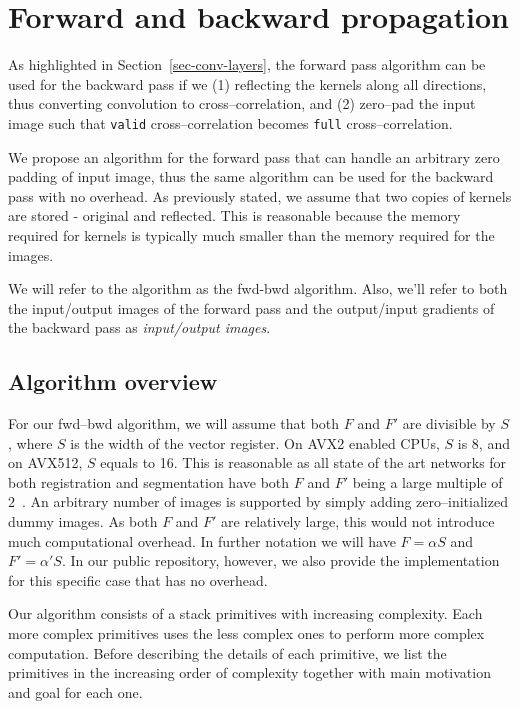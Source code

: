 \section{Forward and backward propagation}

  As highlighted in Section~\ref{sec-conv-layers}, the forward pass
  algorithm can be used for the backward pass if we (1) reflecting the
  kernels along all directions, thus converting convolution to
  cross--correlation, and (2) zero--pad the input image such that
  \texttt{valid} cross--correlation becomes \texttt{full}
  cross--correlation.

  We propose an algorithm for the forward pass that can handle an
  arbitrary zero padding of input image, thus the same algorithm can
  be used for the backward pass with no overhead.  As previously
  stated, we assume that two copies of kernels are stored - original
  and reflected.  This is reasonable because the memory required for
  kernels is typically much smaller than the memory required for the
  images.

  We will refer to the algorithm as the fwd-bwd algorithm.  Also,
  we'll refer to both the input/output images of the forward pass and
  the output/input gradients of the backward pass as
  \emph{input/output images}.

  \subsection{Algorithm overview}

  For our fwd--bwd algorithm, we will assume that both $F$ and $F'$
  are divisible by $S$, where $S$ is the width of the vector register.
  On AVX2 enabled CPUs, $S$ is 8, and on AVX512, $S$ equals to 16.
  This is reasonable as all state of the art networks for both
  registration and segmentation have both $F$ and $F'$ being a large
  multiple of $2$~\cite{krizhevsky2012imagenet, ronneberger2015u,
    simonyan2014very, sermanet2013overfeat, long2015fully,
    tran2015learning, ji20133d, maturana_iros_2015,
    maturana_icra_2014}.  An arbitrary number of images is supported
  by simply adding zero--initialized dummy images.  As both $F$ and
  $F'$ are relatively large, this would not introduce much
  computational overhead.  In further notation we will have $F =
  \alpha S$ and $F' = \alpha' S$.  In our public repository, however,
  we also provide the implementation for this specific case that has
  no overhead.

  Our algorithm consists of a stack primitives with increasing
  complexity.  Each more complex primitives uses the less complex ones
  to perform more complex computation.  Before describing the details
  of each primitive, we list the primitives in the increasing order of
  complexity together with main motivation and goal for each one.

